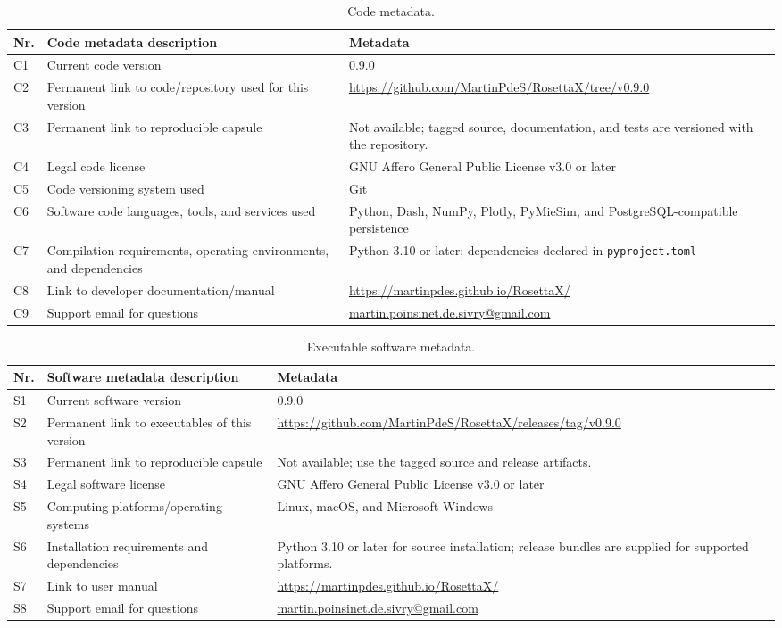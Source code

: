 \documentclass[preprint,12pt]{elsarticle}
\begin{document}
\begin{table}[t]
\centering
\footnotesize
\caption{Code metadata.}
\label{tab:code-metadata}
\begin{tabularx}{\textwidth}{@{}p{0.35in}p{2.25in}Y@{}}
\toprule
Nr. & Code metadata description & Metadata \\
\midrule
C1 & Current code version & 0.9.0 \\
C2 & Permanent link to code/repository used for this version &
\url{https://github.com/MartinPdeS/RosettaX/tree/v0.9.0} \\
C3 & Permanent link to reproducible capsule & Not available; tagged source,
documentation, and tests are versioned with the repository. \\
C4 & Legal code license & GNU Affero General Public License v3.0 or later \\
C5 & Code versioning system used & Git \\
C6 & Software code languages, tools, and services used & Python, Dash, NumPy,
Plotly, PyMieSim, and PostgreSQL-compatible persistence \\
C7 & Compilation requirements, operating environments, and dependencies &
Python 3.10 or later; dependencies declared in \texttt{pyproject.toml} \\
C8 & Link to developer documentation/manual &
\url{https://martinpdes.github.io/RosettaX/} \\
C9 & Support email for questions &
\href{mailto:martin.poinsinet.de.sivry@gmail.com}{martin.poinsinet.de.sivry@gmail.com} \\
\bottomrule
\end{tabularx}
\end{table}

\begin{table}[t]
\centering
\footnotesize
\caption{Executable software metadata.}
\label{tab:software-metadata}
\begin{tabularx}{\textwidth}{@{}p{0.35in}p{2.25in}Y@{}}
\toprule
Nr. & Software metadata description & Metadata \\
\midrule
S1 & Current software version & 0.9.0 \\
S2 & Permanent link to executables of this version &
\url{https://github.com/MartinPdeS/RosettaX/releases/tag/v0.9.0} \\
S3 & Permanent link to reproducible capsule & Not available; use the tagged
source and release artifacts. \\
S4 & Legal software license & GNU Affero General Public License v3.0 or later \\
S5 & Computing platforms/operating systems & Linux, macOS, and Microsoft Windows \\
S6 & Installation requirements and dependencies & Python 3.10 or later for
source installation; release bundles are supplied for supported platforms. \\
S7 & Link to user manual & \url{https://martinpdes.github.io/RosettaX/} \\
S8 & Support email for questions &
\href{mailto:martin.poinsinet.de.sivry@gmail.com}{martin.poinsinet.de.sivry@gmail.com} \\
\bottomrule
\end{tabularx}
\end{table}
\end{document}

